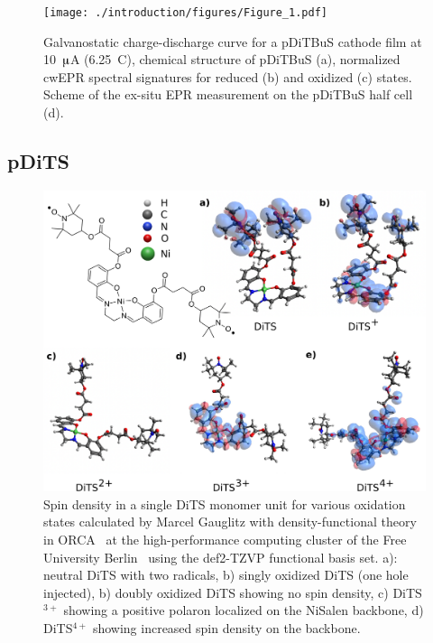 \begin{figure}[h]
\center
	\texttt{[image: ./introduction/figures/Figure\_1.pdf]}
	\caption{Galvanostatic charge-discharge curve for a pDiTBuS cathode film at 10~$\muup$A (6.25~C), chemical structure of pDiTBuS (a), normalized cwEPR spectral signatures for reduced (b) and oxidized (c) states. Scheme of the ex-situ EPR measurement on the pDiTBuS half cell (d).}
	\label{fig:Figure_1}
\end{figure}

\subsection{pDiTS}

\begin{figure}[h]
\center
	\includegraphics[width=1\textwidth]{./electrochemistry/figures/DFT_DITS.pdf}
	\caption{Spin density in a single DiTS monomer unit for various oxidation states calculated by Marcel Gauglitz with density-functional theory in ORCA~\cite{ORCA} at the high-performance computing cluster of the Free University Berlin~\cite{HPC_FUB} using the def2-TZVP functional basis set. a): neutral DiTS with two radicals, b) singly oxidized DiTS (one hole injected), b) doubly oxidized DiTS showing no spin density, c) DiTS$^{3+}$ showing a positive polaron localized on the NiSalen backbone, d) DiTS$^{4+}$ showing increased spin density on the backbone.}
	\label{fig:DiTS_DFT}
\end{figure}



